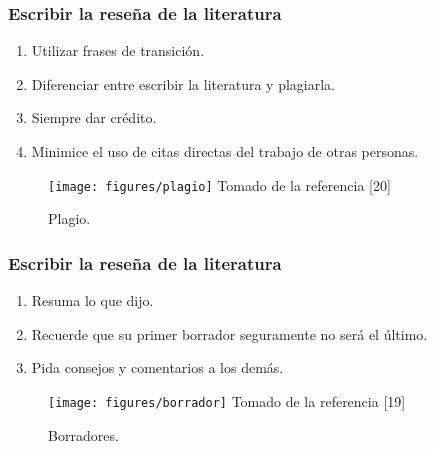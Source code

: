 \documentclass{beamer}
\newcounter{sauvegardeenumi}
\newcommand{\asuivre}{\setcounter{sauvegardeenumi}{\theenumi}}
\newcommand{\suite}{\setcounter{enumi}{\thesauvegardeenumi}}
\begin{document}
    \begin{frame}\frametitle{Escribir la rese\~na de la literatura}
    \begin{multicols}{2}
                \begin{enumerate}
                    \suite
                    \item Utilizar frases de transici\'on.
                    \item Diferenciar entre escribir la literatura y plagiarla.  
                    \item Siempre dar cr\'edito.       
                    \item Minimice el uso de citas directas del trabajo de otras personas.    
                    \asuivre
                \end{enumerate}   
                \begin{figure}
                    \texttt{[image: figures/plagio]}
                    \newline
                    {\tiny Tomado de la referencia [20] }
                    \caption{Plagio. }
                \end{figure}               
            \end{multicols}
    \end{frame}

    \begin{frame}\frametitle{Escribir la rese\~na de la literatura}
    \begin{multicols}{2}
                \begin{enumerate}
                    \suite
                    \item Resuma lo que dijo.
                    \item Recuerde que su primer borrador seguramente no ser\'a el \'ultimo. 
                    \item Pida consejos y comentarios a los dem\'as.                   
                \end{enumerate}         
                \begin{figure}
                    \texttt{[image: figures/borrador]}
                    \newline
                    {\tiny Tomado de la referencia [19] }
                    \caption{Borradores. }
                \end{figure}      
            \end{multicols}
    \end{frame}
\end{document}
